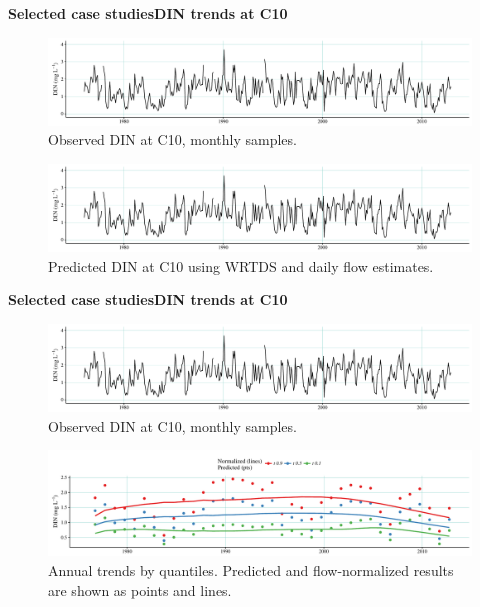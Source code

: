 \documentclass[serif]{beamer}\usepackage[]{graphicx}\usepackage[]{color}
\begin{document}
\begin{frame}[t]{\textbf{Selected case studies}}{\textbf{DIN trends at C10}}
\onslide<+->
\begin{figure}
\centerline{\includegraphics[width = \textwidth, page = 1]{fig/c10obspred.pdf}}
\caption{Observed DIN at C10, monthly samples.}
\end{figure}
\vspace{-0.2in}
\onslide<+->
\begin{figure}
\centerline{\includegraphics[width = \textwidth, page = 2]{fig/c10obspred.pdf}}
\caption{Predicted DIN at C10 using WRTDS and daily flow estimates.}
\end{figure}
\end{frame}

\begin{frame}[t]{\textbf{Selected case studies}}{\textbf{DIN trends at C10}}
\begin{figure}
\centerline{\includegraphics[width = \textwidth, page = 1]{fig/c10obspred.pdf}}
\caption{Observed DIN at C10, monthly samples.}
\end{figure}
\vspace{-0.45in}
\begin{figure}
\centerline{\includegraphics[width = \textwidth]{fig/c10prdnrm.pdf}}
\caption{Annual trends by quantiles. Predicted and flow-normalized results are shown as points and lines.}
\end{figure}
\end{frame}
\end{document}
